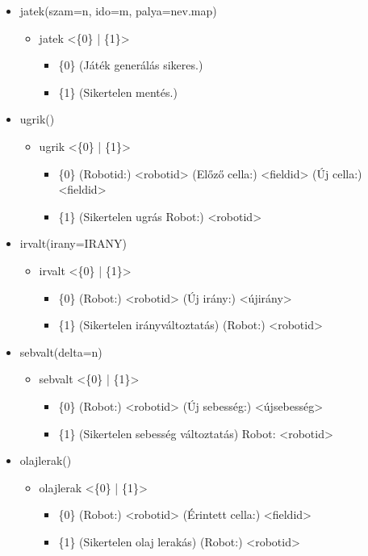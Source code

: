 \begin{itemize}
	\item jatek(szam=n, ido=m, palya=nev.map)
	\begin{itemize}
		\item jatek  <\{0\} | \{1\}>
		\begin{itemize}
			\item \{0\} (Játék generálás sikeres.)
			\item \{1\} (Sikertelen mentés.)
		\end{itemize}
	\end{itemize}	
	
	\item ugrik()
	\begin{itemize}
		\item ugrik  <\{0\} | \{1\}>
		\begin{itemize}
			\item \{0\} (Robotid:) <robotid> (Előző cella:) <fieldid> (Új cella:) <fieldid>
			\item \{1\} (Sikertelen ugrás Robot:) <robotid>
		\end{itemize}
	\end{itemize}	
	
	\item irvalt(irany=IRANY)
	\begin{itemize}
		\item irvalt  <\{0\} | \{1\}>
		\begin{itemize}
				\item \{0\} (Robot:) <robotid> (Új irány:) <újirány>
				\item \{1\} (Sikertelen irányváltoztatás) (Robot:) <robotid>
		\end{itemize}
	\end{itemize}
	
	\item sebvalt(delta=n)
	\begin{itemize}
		\item sebvalt  <\{0\} | \{1\}>
		\begin{itemize}
			\item \{0\} (Robot:) <robotid> (Új sebesség:) <újsebesség>
			\item \{1\} (Sikertelen sebesség változtatás) Robot: <robotid>
		\end{itemize}
	\end{itemize}
	

	
	\item olajlerak()
	\begin{itemize}
		\item olajlerak  <\{0\} | \{1\}>
		\begin{itemize}
			\item \{0\} (Robot:) <robotid>  (Érintett cella:) <fieldid>
			\item \{1\} (Sikertelen olaj lerakás) (Robot:) <robotid>
		\end{itemize}
	\end{itemize}
	

\end{itemize}
